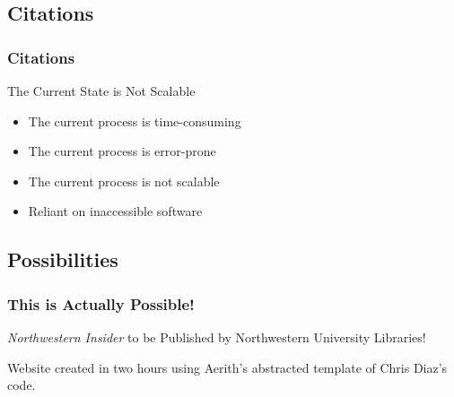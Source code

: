 \documentclass[aspectratio=169,9pt,xcolor=dvipsnames]{beamer}
\begin{document}
\subsection{Citations}
\begin{frame}
    \frametitle{Citations}
    \begin{center}
    \end{center}
        \begin{block}{The Current State is Not Scalable}
            \begin{itemize}
                \item The current process is time-consuming
                \item The current process is error-prone
                \item The current process is not scalable
                \item Reliant on inaccessible software
            \end{itemize}
        \end{block}
\end{frame}

\subsection{Possibilities}
\begin{frame}
    \frametitle{This is Actually Possible!}
    \begin{center}
        \huge{\textit{Northwestern Insider} to be Published by Northwestern University Libraries!}
    \end{center}
    \begin{center}
        \large{Website created in two hours using Aerith's abstracted template of Chris Diaz's code.}
    \end{center}
\end{frame}
\end{document}
